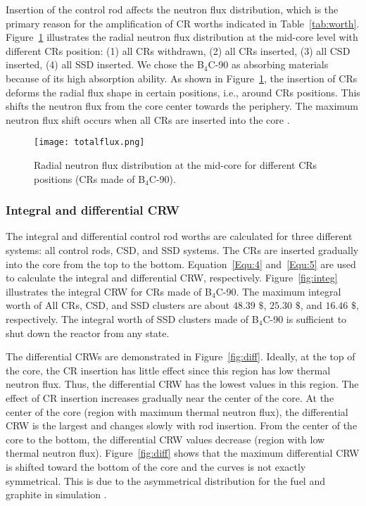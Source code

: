 Insertion of the control rod affects the neutron flux distribution, which is 
the primary reason for the amplification of CR worths indicated in 
Table~\ref{tab:worth}. Figure~\ref{fig:totalflux} illustrates the radial 
neutron flux distribution at the mid-core level with different CRs position: 
(1) all CRs withdrawn, (2) all CRs inserted, (3) all CSD inserted, (4) all SSD 
inserted. We chose the B$_4$C-90 as absorbing materials because of its high 
absorption ability. As shown in Figure~\ref{fig:totalflux}, the insertion of 
CRs deforms the radial flux shape in certain positions, i.e., around CRs 
positions. This shifts the neutron flux from the core center towards the 
periphery. The maximum neutron flux shift occurs when all CRs are inserted 
into the core \cite{girardin2007control}.
\begin{figure}[!ht]
	\centering
	\texttt{[image: totalflux.png]}
	\vspace{-0.5in}
	\caption{Radial neutron flux distribution at the mid-core for different 
	CRs positions (CRs made of B$_4$C-90).} 
	\label{fig:totalflux}
\end{figure}
 

\subsubsection{Integral and differential CRW}

The integral and differential control rod worths are calculated for three 
different systems: all control rods, CSD, and SSD systems. The CRs are 
inserted gradually into the core from the top to the bottom. 
Equation~\ref{Equ:4} and~\ref{Equ:5} are used to calculate the integral and 
differential CRW, respectively. Figure~\ref{fig:integ} illustrates the integral CRW for CRs 
made of B$_4$C-90. The maximum integral worth of All CRs, CSD, and SSD 
clusters are about $48.39$ $\$$, $25.30$ $\$$, and $16.46$ $\$$, respectively. The 
integral worth of SSD clusters made of B$_4$C-90 is sufficient to shut down the reactor from any 
state.

The differential CRWs are demonstrated in Figure~\ref{fig:diff}. Ideally, at the top of the core, the CR insertion has little effect since this region has low thermal neutron flux. Thus, the differential CRW has the lowest values in this region. The effect of CR insertion increases gradually near the center of the core. At the center of the core (region with maximum thermal neutron flux), the differential CRW is the largest and changes slowly with rod insertion. From the center of the core to the bottom, the differential CRW values decrease (region with low thermal neutron flux). Figure~\ref{fig:diff} shows that the maximum differential CRW is shifted toward the bottom of the core and the curves is not exactly symmetrical. This is due to the asymmetrical distribution for the fuel and graphite in simulation \cite{xuemei2013study,son2016control}.

